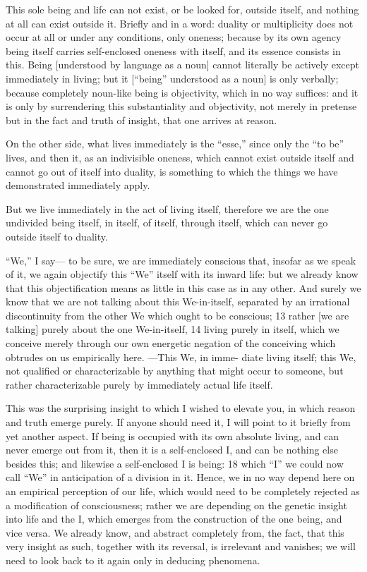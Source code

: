 This sole being and life can not exist,
or be looked for, outside itself,
and nothing at all can exist outside it.
Briefly and in a word:
duality or multiplicity does not occur at all
or under any conditions, only oneness;
because by its own agency
being itself carries self-enclosed oneness with itself,
and its essence consists in this.
Being [understood by language as a noun]
cannot literally be actively
except immediately in living;
but it [“being” understood as a noun] is only verbally;
because completely noun-like being is objectivity,
which in no way suffices:
and it is only by surrendering
this substantiality and objectivity,
not merely in pretense
but in the fact and truth of insight,
that one arrives at reason.

On the other side,
what lives immediately is the “esse,”
since only the “to be” lives,
and then it, as an indivisible oneness,
which cannot exist outside itself
and cannot go out of itself into duality,
is something to which the things
we have demonstrated immediately apply.

But we live immediately in the act of living itself,
therefore we are the one undivided being itself,
in itself, of itself, through itself,
which can never go outside itself to duality.

“We,” I say— to be sure, we are immediately conscious that, insofar as
we speak of it, we again objectify this “We” itself with its inward life: but we
already know that this objectification means as little in this case as in any
other.
And surely we know that we are not talking about this We-in-itself,
separated by an irrational discontinuity from the other We which ought to be
conscious; 13 rather [we are talking] purely about the one We-in-itself, 14 living
purely in itself, which we conceive merely through our own energetic negation
of the conceiving which obtrudes on us empirically here.
—This We, in imme-
diate living itself; this We, not qualified or characterizable by anything that
might occur to someone, but rather characterizable purely by immediately
actual life itself.

This was the surprising insight to which I wished to elevate you, in
which reason and truth emerge purely.
If anyone should need it, I will point
to it briefly from yet another aspect.
If being is occupied with its own absolute
living, and can never emerge out from it, then it is a self-enclosed I, and can
be nothing else besides this; and likewise a self-enclosed I is being: 18 which “I”
we could now call “We” in anticipation of a division in it.
Hence,
we in no way depend here on an empirical perception of our life, which would
need to be completely rejected as a modification of consciousness; rather we
are depending on the genetic insight into life and the I, which emerges from
the construction of the one being, and vice versa.
We already know, and
abstract completely from, the fact, that this very insight as such, together with
its reversal, is irrelevant and vanishes; we will need to look back to it again only
in deducing phenomena.


